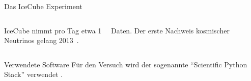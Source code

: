 \documentclass[t]{beamer}
\begin{document}
\begin{columns}[onlytextwidth]
\begin{column}{0.5\textwidth}
\begin{block}{Das IceCube Experiment}
\begin{columns}[onlytextwidth]
\begin{column}{0.48\textwidth}
            IceCube nimmt pro Tag etwa \SI{1}{\tera\byte} Daten.
            Der erste Nachweis kosmischer Neutrinos gelang 2013~\cite{icecube_science}.
          \end{column}%
        \end{columns}%
      \end{block}%
      \begin{block}{Verwendete Software}%
        Für den Versuch wird der sogenannte \enquote{Scientific Python Stack} verwendet \cite{scipy,matplotlib,sklearn,numpy}.\par
      \end{block}

\end{column}
\end{columns}
\end{document}
